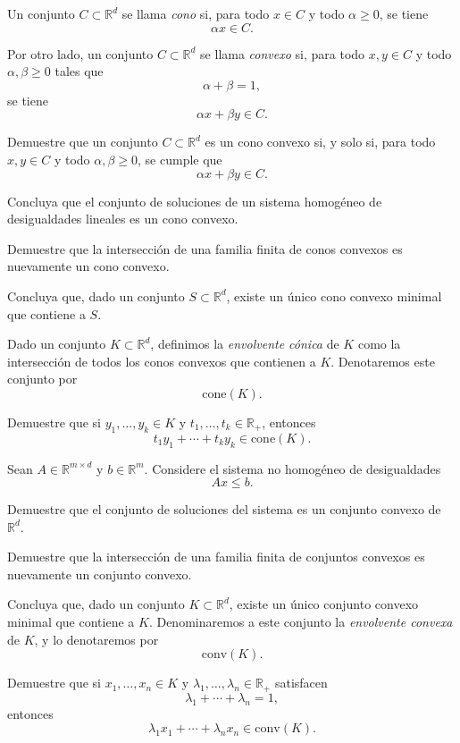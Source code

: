 \documentclass[a4paper,12pt]{article}
\renewcommand{\conv}[1]{\mathrm{conv}(#1)}
\renewcommand{\cone}[1]{\mathrm{cone}(#1)}
\begin{document}
\begin{exerciselist}
\item Un conjunto \(C \subset \mathbb{R}^d\) se llama \emph{cono} si, para todo \(x \in C\) y todo \(\alpha \geq 0\), se tiene
\[
\alpha x \in C.
\]

Por otro lado, un conjunto \(C \subset \mathbb{R}^d\) se llama \emph{convexo} si, para todo \(x,y \in C\) y todo \(\alpha,\beta \geq 0\) tales que
\[
\alpha+\beta=1,
\]
se tiene
\[
\alpha x+\beta y \in C.
\]

Demuestre que un conjunto \(C \subset \mathbb{R}^d\) es un cono convexo si, y solo si, para todo \(x,y \in C\) y todo \(\alpha,\beta \geq 0\), se cumple que
\[
\alpha x+\beta y \in C.
\]

Concluya que el conjunto de soluciones de un sistema homogéneo de desigualdades lineales es un cono convexo.

\item Demuestre que la intersección de una familia finita de conos convexos es nuevamente un cono convexo.

Concluya que, dado un conjunto \(S \subset \mathbb{R}^d\), existe un único cono convexo minimal que contiene a \(S\).

\item Dado un conjunto \(K \subset \mathbb{R}^d\), definimos la \emph{envolvente cónica} de \(K\) como la intersección de todos los conos convexos que contienen a \(K\). Denotaremos este conjunto por
\[
\cone{K}.
\]

Demuestre que si \(y_1,\dots,y_k \in K\) y \(t_1,\dots,t_k \in \mathbb{R}_+\), entonces
\[
t_1 y_1+\cdots+t_k y_k \in \cone{K}.
\]

\item Sean \(A \in \mathbb{R}^{m\times d}\) y \(b \in \mathbb{R}^m\). Considere el sistema no homogéneo de desigualdades
\[
Ax \leq b.
\]

Demuestre que el conjunto de soluciones del sistema es un conjunto convexo de \(\mathbb{R}^d\).

\item Demuestre que la intersección de una familia finita de conjuntos convexos es nuevamente un conjunto convexo.

Concluya que, dado un conjunto \(K \subset \mathbb{R}^d\), existe un único conjunto convexo minimal que contiene a \(K\). Denominaremos a este conjunto la \emph{envolvente convexa} de \(K\), y lo denotaremos por
\[
\conv{K}.
\]

\item Demuestre que si \(x_1,\dots,x_n \in K\) y \(\lambda_1,\dots,\lambda_n \in \mathbb{R}_+\) satisfacen
\[
\lambda_1+\cdots+\lambda_n=1,
\]
entonces
\[
\lambda_1x_1+\cdots+\lambda_nx_n \in \conv{K}.
\]

\end{exerciselist}
\end{document}
